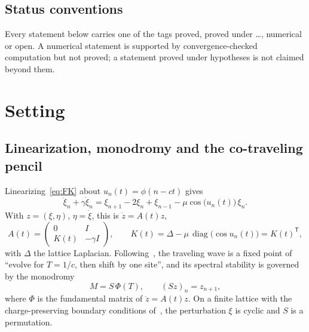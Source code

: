 \documentclass[11pt]{article}
\theoremstyle{plain}
\theoremstyle{definition}
\theoremstyle{remark}
\newcommand{\T}{\mathsf T}
\newcommand{\tagP}{\textsf{proved}}
\newcommand{\tagC}[1]{\textsf{proved under #1}}
\newcommand{\tagN}{\textsf{numerical}}
\newcommand{\tagO}{\textsf{open}}
\begin{document}
\subsection{Status conventions}
Every statement below carries one of the tags \tagP, \tagC{\dots}, \tagN{} or \tagO. A
\tagN{} statement is supported by convergence-checked computation but not proved; a
statement proved under hypotheses is not claimed beyond them.

\section{Setting}\label{sec:setting}

\subsection{Linearization, monodromy and the co-traveling pencil}

Linearizing~\eqref{eq:FK} about $u_n(t)=\phi(n-ct)$ gives
\begin{equation}\label{eq:lin}
  \ddot\xi_n+\gamma\dot\xi_n=\xi_{n+1}-2\xi_n+\xi_{n-1}-\mu\cos\bigl(u_n(t)\bigr)\,\xi_n .
\end{equation}
With $z=(\xi,\eta)$, $\eta=\dot\xi$, this is $\dot z=A(t)z$,
\begin{equation}\label{eq:A}
  A(t)=\begin{pmatrix}0&I\\K(t)&-\gamma I\end{pmatrix},\qquad
  K(t)=\Delta-\mu\,\operatorname{diag}\bigl(\cos u_n(t)\bigr)=K(t)^{\T},
\end{equation}
with $\Delta$ the lattice Laplacian. Following~\cite{CKVX17,VCKX20}, the traveling wave is a
fixed point of ``evolve for $T=1/c$, then shift by one site'', and its spectral stability is
governed by the monodromy
\begin{equation}\label{eq:monodromy}
  M=S\,\Phi(T),\qquad (Sz)_n=z_{n+1},
\end{equation}
where $\Phi$ is the fundamental matrix of $\dot z=A(t)z$. On a finite lattice with the
charge-preserving boundary conditions of~\cite{VCKX20}, the perturbation $\xi$ is cyclic and
$S$ is a permutation.
\end{document}
